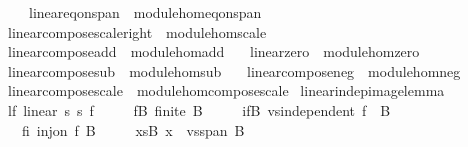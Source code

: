 \begin{isabellebody}
{}\isanewline
\ \ \ \ \ \ linear{\isacharunderscore}{\kern0pt}eq{\isacharunderscore}{\kern0pt}on{\isacharunderscore}{\kern0pt}span\ {\isacharequal}{\kern0pt}\ module{\isacharunderscore}{\kern0pt}hom{\isacharunderscore}{\kern0pt}eq{\isacharunderscore}{\kern0pt}on{\isacharunderscore}{\kern0pt}span\isanewline
\ \ \ linear{\isacharunderscore}{\kern0pt}compose{\isacharunderscore}{\kern0pt}scale{\isacharunderscore}{\kern0pt}right\ {\isacharequal}{\kern0pt}\ module{\isacharunderscore}{\kern0pt}hom{\isacharunderscore}{\kern0pt}scale\isanewline
\ \ \ linear{\isacharunderscore}{\kern0pt}compose{\isacharunderscore}{\kern0pt}add\ {\isacharequal}{\kern0pt}\ module{\isacharunderscore}{\kern0pt}hom{\isacharunderscore}{\kern0pt}add\isanewline
\ \ \ linear{\isacharunderscore}{\kern0pt}zero\ {\isacharequal}{\kern0pt}\ module{\isacharunderscore}{\kern0pt}hom{\isacharunderscore}{\kern0pt}zero\isanewline
\ \ \ linear{\isacharunderscore}{\kern0pt}compose{\isacharunderscore}{\kern0pt}sub\ {\isacharequal}{\kern0pt}\ module{\isacharunderscore}{\kern0pt}hom{\isacharunderscore}{\kern0pt}sub\isanewline
\ \ \ linear{\isacharunderscore}{\kern0pt}compose{\isacharunderscore}{\kern0pt}neg\ {\isacharequal}{\kern0pt}\ module{\isacharunderscore}{\kern0pt}hom{\isacharunderscore}{\kern0pt}neg\isanewline
\ \ \ linear{\isacharunderscore}{\kern0pt}compose{\isacharunderscore}{\kern0pt}scale\ {\isacharequal}{\kern0pt}\ module{\isacharunderscore}{\kern0pt}hom{\isacharunderscore}{\kern0pt}compose{\isacharunderscore}{\kern0pt}scale\isanewline
\isanewline
{}\isamarkupfalse%
\ linear{\isacharunderscore}{\kern0pt}indep{\isacharunderscore}{\kern0pt}image{\isacharunderscore}{\kern0pt}lemma{\isacharcolon}{\kern0pt}\isanewline
\ \ \ lf{\isacharcolon}{\kern0pt}\ {\isachardoublequoteopen}linear\ s{}\ s{}\ f{\isachardoublequoteclose}\isanewline
\ \ \ \ \ fB{\isacharcolon}{\kern0pt}\ {\isachardoublequoteopen}finite\ B{\isachardoublequoteclose}\isanewline
\ \ \ \ \ ifB{\isacharcolon}{\kern0pt}\ {\isachardoublequoteopen}vs{}{\isachardot}{\kern0pt}independent\ {\isacharparenleft}{\kern0pt}f\ {\isacharbackquote}{\kern0pt}\ B{\isacharparenright}{\kern0pt}{\isachardoublequoteclose}\isanewline
\ \ \ \ \ fi{\isacharcolon}{\kern0pt}\ {\isachardoublequoteopen}inj{\isacharunderscore}{\kern0pt}on\ f\ B{\isachardoublequoteclose}\isanewline
\ \ \ \ \ xsB{\isacharcolon}{\kern0pt}\ {\isachardoublequoteopen}x\ {\isasymin}\ vs{}{\isachardot}{\kern0pt}span\ B{\isachardoublequoteclose}\isanewline

\end{isabellebody}

